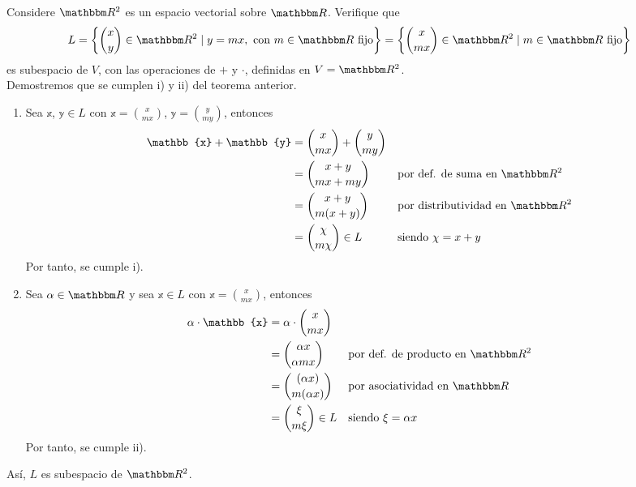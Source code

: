 \begin{example}
    Considere $\RR[2]$ es un espacio vectorial sobre $\RR$. Verifique que
    \begin{align*}
        L & = \left\{ \binom{x}{y} \in \RR[2] \mid y = mx, \text{ con }  m \in \RR \text{ fijo} \right\} = \left\{ \binom{x}{mx} \in \RR[2] \mid m \in \RR \text{ fijo} \right\}
    \end{align*}
    es subespacio de $V$, con las operaciones de $+$ y $\cdot$, definidas en $V = \RR[2]$. \\
    \solucion Demostremos que se cumplen i) y ii) del teorema anterior.
    \begin{enumerate}[label=\roman*)]
        \item Sea $\mathbb{x}$, $\mathbb{y} \in L$ con $\displaystyle \mathbb{x} = \binom{x}{mx}$, $\displaystyle \mathbb{y} = \binom{y}{my}$, entonces
        \begin{align*}
            \mathbb{x} + \mathbb{y} & = \binom{x}{mx} + \binom{y}{my} \\
            & = \binom{x+y}{mx+my} && \text{por def. de suma en $\RR[2]$} \\
            & = \binom{x+y}{m(x+y)} && \text{por distributividad en $\RR[2]$} \\
            & = \binom{\chi}{m\chi} \in L && \text{siendo $\chi = x + y$}
        \end{align*}
        Por tanto, se cumple i).
        \item Sea $\alpha \in \RR$ y sea $\mathbb{x} \in L$ con $\displaystyle \mathbb{x} = \binom{x}{mx}$, entonces
        \begin{align*}
            \alpha \cdot \mathbb{x} & = \alpha \cdot \binom{x}{mx} \\
            & = \binom{\alpha x}{\alpha mx} && \text{por def. de producto en $\RR[2]$} \\
            & = \binom{(\alpha x)}{m(\alpha x)} && \text{por asociatividad en $\RR$} \\
            & = \binom{\xi}{m\xi} \in L && \text{siendo $\xi = \alpha x$}
        \end{align*}
        Por tanto, se cumple ii).
    \end{enumerate}
    Así, $L$ es subespacio de $\RR[2]$.
\end{example}

